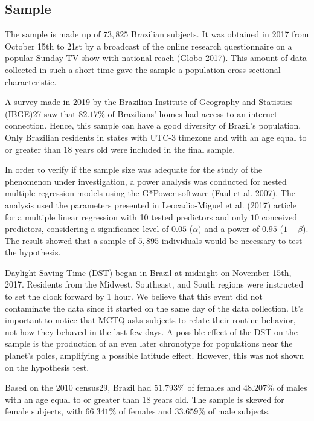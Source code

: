\documentclass[
  12pt,
  a4paper,
  oneside]{tesesusp}
\begin{document}
\hypertarget{sample}{%
\subsection{Sample}\label{sample}}

The sample is made up of \(73,825\) Brazilian subjects. It was obtained
in 2017 from October 15th to 21st by a broadcast of the online research
questionnaire on a popular Sunday TV show with national reach (Globo
2017). This amount of data collected in such a short time gave the
sample a population cross-sectional characteristic.

A survey made in 2019 by the Brazilian Institute of Geography and
Statistics (IBGE)27 saw that \(82.17\%\) of Brazilians' homes had access
to an internet connection. Hence, this sample can have a good diversity
of Brazil's population. Only Brazilian residents in states with UTC-3
timezone and with an age equal to or greater than \(18\) years old were
included in the final sample.

In order to verify if the sample size was adequate for the study of the
phenomenon under investigation, a power analysis was conducted for
nested multiple regression models using the G*Power software (Faul et
al. 2007). The analysis used the parameters presented in Leocadio-Miguel
et al. (2017) article for a multiple linear regression with 10 tested
predictors and only \(10\) conceived predictors, considering a
significance level of \(0.05\) (\(\alpha\)) and a power of \(0.95\)
(\(1 - \beta\)). The result showed that a sample of \(5,895\)
individuals would be necessary to test the hypothesis.

Daylight Saving Time (DST) began in Brazil at midnight on November 15th,
2017. Residents from the Midwest, Southeast, and South regions were
instructed to set the clock forward by 1 hour. We believe that this
event did not contaminate the data since it started on the same day of
the data collection. It's important to notice that MCTQ asks subjects to
relate their routine behavior, not how they behaved in the last few
days. A possible effect of the DST on the sample is the production of an
even later chronotype for populations near the planet's poles,
amplifying a possible latitude effect. However, this was not shown on
the hypothesis test.

Based on the 2010 census29, Brazil had \(51.793\%\) of females and
\(48.207\%\) of males with an age equal to or greater than 18 years old.
The sample is skewed for female subjects, with \(66.341\%\) of females
and \(33.659\%\) of male subjects.
\end{document}
